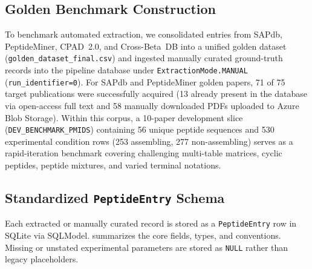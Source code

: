 \subsection{Golden Benchmark Construction}
To benchmark automated extraction, we consolidated entries from SAPdb, PeptideMiner, CPAD~2.0, and Cross-Beta~DB into a unified golden dataset (\texttt{golden\_dataset\_final.csv}) and ingested manually curated ground-truth records into the pipeline database under \texttt{ExtractionMode.MANUAL} (\texttt{run\_identifier=0}). For SAPdb and PeptideMiner golden papers, 71 of 75 target publications were successfully acquired (13 already present in the database via open-access full text and 58 manually downloaded PDFs uploaded to Azure Blob Storage). Within this corpus, a 10-paper development slice (\texttt{DEV\_BENCHMARK\_PMIDS}) containing 56 unique peptide sequences and 530 experimental condition rows (253 assembling, 277 non-assembling) serves as a rapid-iteration benchmark covering challenging multi-table matrices, cyclic peptides, peptide mixtures, and varied terminal notations.

\subsection{Standardized \texttt{PeptideEntry} Schema}
Each extracted or manually curated record is stored as a \texttt{PeptideEntry} row in SQLite via SQLModel.  summarizes the core fields, types, and conventions. Missing or unstated experimental parameters are stored as \texttt{NULL} rather than legacy placeholders.

